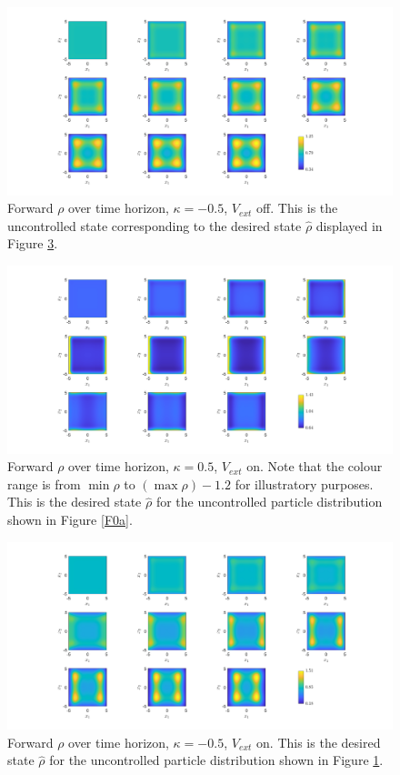 \documentclass[11pt, a4paper]{article}
\theoremstyle{definition}
\newcommand{\hr}{\widehat \rho}
\begin{document}
\begin{figure}[h]
	\centering
	\includegraphics[scale=0.35]{rhokn05.png}
	\caption{Forward $\rho$ over time horizon, $\kappa = - 0.5$, $V_{ext}$ off. This is the uncontrolled state corresponding to the desired state $\hr$ displayed in Figure \ref{F2b}.} 
	\label{F0b}
\end{figure}



\begin{figure}[h]
	\centering
	\includegraphics[scale=0.35]{rhok05V.png}
	\caption{Forward $\rho$ over time horizon, $\kappa = 0.5$, $V_{ext}$ on. Note that the colour range is from $\min \rho$ to $(\max \rho) - 1.2$ for illustratory purposes. This is the desired state $\hr$ for the uncontrolled particle distribution shown in Figure \ref{F0a}.} 
	\label{F2a}
\end{figure}
\begin{figure}[h]
	\centering
	\includegraphics[scale=0.35]{rhokn05V.png}
	\caption{Forward $\rho$ over time horizon, $\kappa = - 0.5$, $V_{ext}$ on. This is the desired state $\hr$ for the uncontrolled particle distribution shown in Figure \ref{F0b}.} 
	\label{F2b}
\end{figure}
\end{document}
